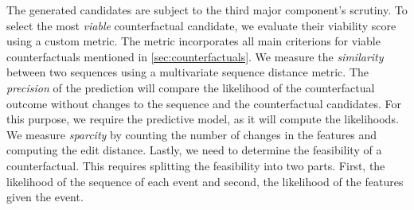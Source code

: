 \documentclass[./../../paper.tex]{subfiles}
\begin{document}
The generated candidates are subject to the third major component's scrutiny. To select the most \emph{viable} counterfactual candidate, we evaluate their viability score using a custom metric. The metric incorporates all main criterions for viable counterfactuals mentioned in \autoref{sec:counterfactuals}. We measure the \emph{similarity} between two sequences using a multivariate sequence distance metric. The \emph{precision} of the prediction will compare the likelihood of the counterfactual outcome without changes to the sequence and the counterfactual candidates. For this purpose, we require the predictive model, as it will compute the likelihoods. We measure \emph{sparcity} by counting the number of changes in the features and computing the edit distance. Lastly, we need to determine the feasibility of a counterfactual. This requires splitting the feasibility into two parts. First, the likelihood of the sequence of each event and second, the likelihood of the features given the event.
\end{document}

